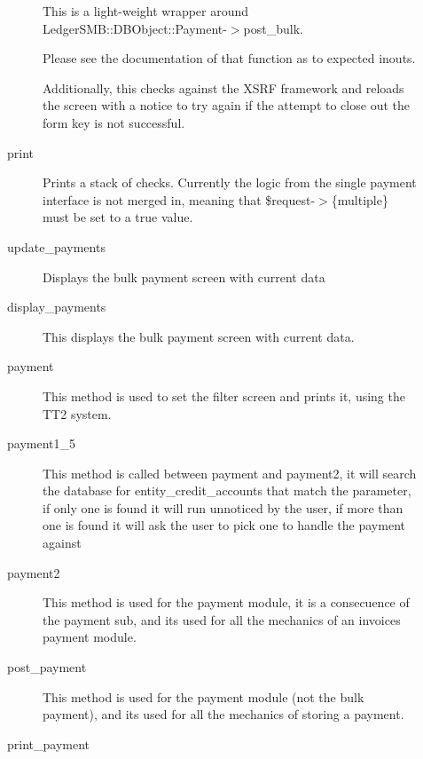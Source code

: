 \begin{description}
\begin{description}
This is a light-weight wrapper around LedgerSMB::DBObject::Payment-$>$post\_bulk.



Please see the documentation of that function as to expected inouts.



Additionally, this checks against the XSRF framework and  reloads the screen 
with a notice to try again if the attempt to close out the form key is not 
successful.


\item[{print}] \mbox{}

Prints a stack of checks.  Currently the logic from the single payment interface
is not merged in, meaning that \$request-$>$\{multiple\} must be set to a true value.


\item[{update\_payments}] \mbox{}

Displays the bulk payment screen with current data


\item[{display\_payments}] \mbox{}

This displays the bulk payment screen with current data.


\item[{payment}] \mbox{}

This method is used to set the filter screen and prints it, using the 
TT2 system.


\item[{payment1\_5}] \mbox{}

This method is called between payment and payment2, it will search the database
for entity\_credit\_accounts that match the parameter, if only one is found it will
run unnoticed by the user, if more than one is found it will ask the user to pick 
one to handle the payment against


\item[{payment2}] \mbox{}

This method is used  for the payment module, it is a consecuence of the payment sub,
and its used for all the mechanics of an invoices payment module.


\item[{post\_payment}] \mbox{}

This method is used  for the payment module (not the bulk payment),
and its used for all the mechanics of storing a payment.


\item[{print\_payment}] \mbox{}


\end{description}
\end{description}
